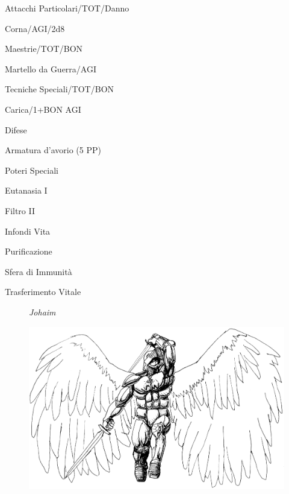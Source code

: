 \begin{parmostro}{Attacchi Particolari/TOT/Danno}
\item Corna/AGI/2d8
\end{parmostro}

\begin{parmostro}{Maestrie/TOT/BON}
\item Martello da Guerra/AGI
\end{parmostro}

\begin{parmostro}{Tecniche Speciali/TOT/BON}
\item Carica/1+BON AGI
\end{parmostro}

\begin{parmostro}{Difese}
\item  Armatura d'avorio (5 PP)
\end{parmostro}

\begin{parmostro}{Poteri Speciali}
\item Eutanasia I
\item Filtro II
\item Infondi Vita
\item Purificazione
\item Sfera di Immunit\`a
\item Trasferimento Vitale
\end{parmostro}

\begin{figure}[t]
\begin{center}
{\it Johaim}\par\bigskip
\includegraphics{johaim.eps}
\end{center}
\end{figure}


